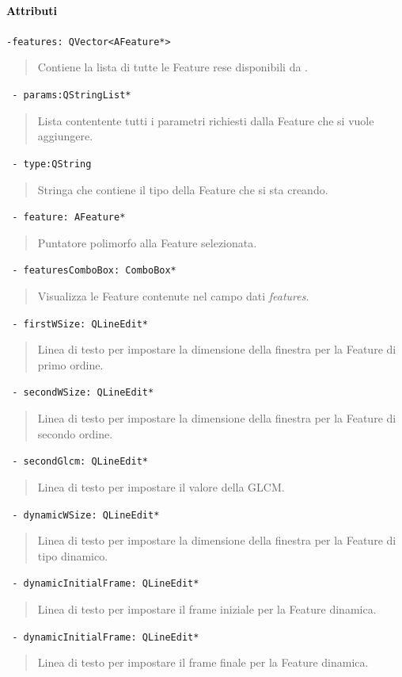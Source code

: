 \paragraph{\textcolor{black}{Attributi\\}}
\color{teal}\verb!-features: QVector<AFeature*>!
\color{black}
\begin{quote}
Contiene la lista di tutte le Feature\g{} rese disponibili da \project.
\end{quote}
\color{teal}\verb! - params:QStringList*!
\color{black} 
\begin{quote}
Lista contentente tutti i parametri richiesti dalla Feature\g{} che si vuole aggiungere.
\end{quote}
\color{teal}\verb! - type:QString!
\color{black} 
\begin{quote}
Stringa che contiene il tipo della Feature\g{} che si sta creando.
\end{quote}
\color{teal}\verb! - feature: AFeature*!
\color{black} 
\begin{quote}Puntatore polimorfo alla Feature\g{} selezionata.
\end{quote}
\color{teal}\verb! - featuresComboBox: ComboBox*!
\color{black} 
\begin{quote}Visualizza le Feature\g{} contenute nel campo dati \emph{features}.
\end{quote}
\color{teal}\verb! - firstWSize: QLineEdit*!
\color{black} 
\begin{quote}Linea di testo per impostare la dimensione della finestra per la Feature\g{} di primo ordine.
\end{quote}
\color{teal}\verb! - secondWSize: QLineEdit*!
\color{black} 
\begin{quote}Linea di testo per impostare la dimensione della finestra per la Feature\g{} di secondo ordine.
\end{quote}
\color{teal}\verb! - secondGlcm: QLineEdit*!
\color{black} 
\begin{quote}Linea di testo per impostare il valore della GLCM\g{}.
\end{quote}
\color{teal}\verb! - dynamicWSize: QLineEdit*!
\color{black} 
\begin{quote}Linea di testo per impostare la dimensione della finestra per la Feature\g{} di tipo dinamico.
\end{quote}
\color{teal}\verb! - dynamicInitialFrame: QLineEdit*!
\color{black} 
\begin{quote}Linea di testo per impostare il frame iniziale per la Feature\g{} dinamica.
\end{quote}
\color{teal}\verb! - dynamicInitialFrame: QLineEdit*!
\color{black} 
\begin{quote}Linea di testo per impostare il frame finale per la Feature\g{} dinamica.
\end{quote}

